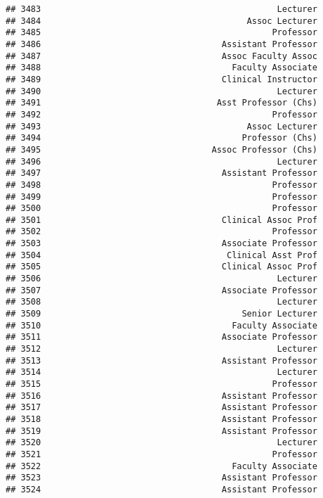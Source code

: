 \documentclass[
]{article}
\begin{document}
\begin{verbatim}
## 3483                                               Lecturer
## 3484                                         Assoc Lecturer
## 3485                                              Professor
## 3486                                    Assistant Professor
## 3487                                    Assoc Faculty Assoc
## 3488                                      Faculty Associate
## 3489                                    Clinical Instructor
## 3490                                               Lecturer
## 3491                                   Asst Professor (Chs)
## 3492                                              Professor
## 3493                                         Assoc Lecturer
## 3494                                        Professor (Chs)
## 3495                                  Assoc Professor (Chs)
## 3496                                               Lecturer
## 3497                                    Assistant Professor
## 3498                                              Professor
## 3499                                              Professor
## 3500                                              Professor
## 3501                                    Clinical Assoc Prof
## 3502                                              Professor
## 3503                                    Associate Professor
## 3504                                     Clinical Asst Prof
## 3505                                    Clinical Assoc Prof
## 3506                                               Lecturer
## 3507                                    Associate Professor
## 3508                                               Lecturer
## 3509                                        Senior Lecturer
## 3510                                      Faculty Associate
## 3511                                    Associate Professor
## 3512                                               Lecturer
## 3513                                    Assistant Professor
## 3514                                               Lecturer
## 3515                                              Professor
## 3516                                    Assistant Professor
## 3517                                    Assistant Professor
## 3518                                    Assistant Professor
## 3519                                    Assistant Professor
## 3520                                               Lecturer
## 3521                                              Professor
## 3522                                      Faculty Associate
## 3523                                    Assistant Professor
## 3524                                    Assistant Professor

\end{verbatim}
\end{document}
